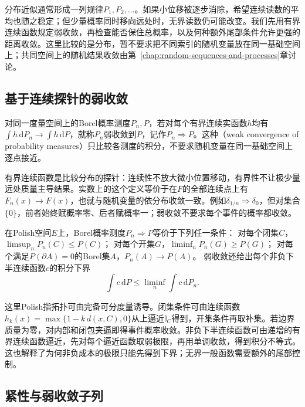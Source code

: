 分布近似通常形成一列规律\(P_1,P_2,\ldots\)。如果小位移被逐步消除，希望连续读数的平均也随之稳定；但少量概率同时移向远处时，无界读数仍可能改变。我们先用有界连续函数规定弱收敛，再检查能否保住总概率，以及何种额外尾部条件允许更强的距离收敛。这里比较的是分布，暂不要求把不同索引的随机变量放在同一基础空间上；共同空间上的随机结果收敛由第~\ref{chap:random-sequences-and-processes}章讨论。

\subsection{基于连续探针的弱收敛}
\label{sec:information-continuous-probe-convergence}
\begin{definition}[概率测度的弱收敛]
\label{def:information-weak-measure-convergence}
对同一度量空间上的Borel概率测度\(P_n,P\)，若对每个有界连续实函数\(h\)均有
\(\int h\,\mathrm dP_n\to\int h\,\mathrm dP\)，就称\(P_n\)弱收敛到\(P\)，记作\(P_n\Rightarrow P\)。这种（weak convergence of probability measures）只比较各测度的积分，不要求随机变量在同一基础空间上逐点接近。
\end{definition}
有界连续函数是比较分布的探针：连续性不放大微小位置移动，有界性不让极少量远处质量主导结果。实数上的这个定义等价于在\(F\)的全部连续点上有\(F_n(x)\to F(x)\)，也就与随机变量的依分布收敛一致。例如\(\delta_{1/n}\Rightarrow\delta_0\)，但对集合\(\{0\}\)，前者始终赋概率零、后者赋概率一；弱收敛不要求每个事件的概率都收敛。

\begin{theorem}[Portmanteau的常用形式]
\label{thm:rv-portmanteau}
在Polish空间\(E\)上，Borel概率测度\(P_n\Rightarrow P\)等价于下列任一条件：
对每个闭集\(C\)，\(\limsup_nP_n(C)\leq P(C)\)；
对每个开集\(G\)，\(\liminf_nP_n(G)\geq P(G)\)；
对每个满足\(P(\partial A)=0\)的Borel集\(A\)，\(P_n(A)\to P(A)\)。
弱收敛还给出每个非负下半连续函数\(c\)的积分下界
\[
\int c\,\mathrm dP\leq\liminf_n\int c\,\mathrm dP_n.
\]
\end{theorem}
这里Polish指拓扑可由完备可分度量诱导。闭集条件可由连续函数
\(h_k(x)=\max\{1-k\,d(x,C),0\}\)从上逼近\(\mathbb I_C\)得到，开集条件再取补集。若边界质量为零，对内部和闭包夹逼即得事件概率收敛。非负下半连续函数可由递增的有界连续函数逼近，先对每个逼近函数取弱极限，再用单调收敛，得到积分不等式。这也解释了为何非负成本的极限只能先得到下界；无界一般函数需要额外的尾部控制。

\subsection{紧性与弱收敛子列}
\label{sec:rv-weak-convergence}

